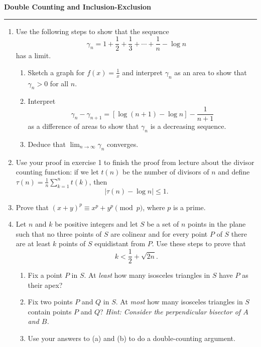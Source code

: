\documentclass[12pt]{article}
\begin{document}
\begin{center}
{\bf \Large Double Counting and Inclusion-Exclusion}
\vspace{0.2cm}
\hrule
\end{center}

\begin{enumerate}
	\item Use the following steps to show that the sequence
	\[
	\gamma_n = 1 + \frac{1}{2} + \frac{1}{3} + \cdots + \frac{1}{n} - \log n
	\]
	has a limit.
	\begin{enumerate}
		\item Sketch a graph for $f(x) = \frac{1}{x}$ and interpret $\gamma_n$ as an area to show that $\gamma_n > 0$ for all $n$.
		\vfill
		\item Interpret
		\[
		\gamma_n - \gamma_{n+1} = [\log(n+1) - \log n] - \frac{1}{n+1}
		\]
		as a difference of areas to show that $\gamma_n$ is a decreasing sequence.
		\vfill
		\item Deduce that $\lim_{n\to \infty}\gamma_n$ converges.
	\end{enumerate}
	\vfill
	\item Use your proof in exercise 1 to finish the proof from lecture about the divisor counting function: if we let $t(n)$ be the number of divisors of $n$ and define $\tau(n) = \frac{1}{n}\sum_{k=1}^nt(k)$, then
	\[
	|\tau(n)-\log n| \leq 1.
	\]
	\vfill

	\item Prove that $(x+y)^p \equiv x^p+y^p \pmod{p}$, where $p$ is a prime.
	\vfill

	\item Let $n$ and $k$ be positive integers and let $S$ be a set of $n$ points in the plane such that no three points of $S$ are colinear and for every point $P$ of $S$ there are at least $k$ points of $S$ equidistant from $P$. Use these steps to prove that
	\[
	k < \frac{1}{2} + \sqrt{2n}.
	\]
	\begin{enumerate}
		\item Fix a point $P$ in $S$. At \textit{least} how many isosceles triangles in $S$ have $P$ as their apex?
		\item Fix two points $P$ and $Q$ in $S$. At \textit{most} how many isosceles triangles in $S$ contain points $P$ and $Q$? \textit{Hint: Consider the perpendicular bisector of $A$ and $B$.}
		\item Use your answers to (a) and (b) to do a double-counting argument.
	\end{enumerate}
	\vfill\null\pagebreak


\end{enumerate}
\end{document}
